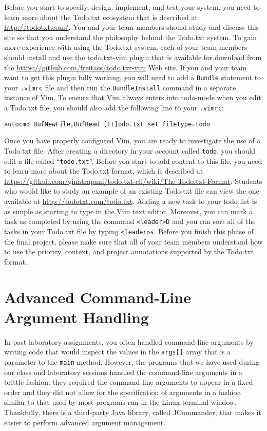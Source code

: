 Before you start to specify, design, implement, and test your system, you need to learn more about the Todo.txt
ecosystem that is described at \url{http://todotxt.com/}. You and your team members should study and discuss this site
so that you understand the philosophy behind the Todo.txt system. To gain more experience with using the Todo.txt
system, each of your team members should install and use the todo.txt-vim plugin that is available for download from the
\url{https://github.com/freitass/todo.txt-vim} Web site. If you and your team want to get this plugin fully working, you
will need to add a {\tt Bundle} statement to your {\tt .vimrc} file and then run the {\tt BundleInstall} command in a
separate instance of Vim.  To ensure that Vim always enters into todo-mode when you edit a Todo.txt file, you should
also add the following line to your {\tt .vimrc}:

{\tt autocmd BufNewFile,BufRead [Tt]odo.txt set filetype=todo}

Once you have properly configured Vim, you are ready to investigate the use of a Todo.txt file. After creating a
directory in your account called {\tt todo}, you should edit a file called ``{\tt todo.txt}''.  Before you start to add
content to this file, you need to learn more about the Todo.txt format, which is described at
\url{https://github.com/ginatrapani/todo.txt-cli/wiki/The-Todo.txt-Format}. Students who would like to study an example
of an existing Todo.txt file can view the one available at \url{http://todotxt.com/todo.txt}. Adding a new task to your
todo list is as simple as starting to type in the Vim text editor.  Moreover, you can mark a task as completed by using
the command {\tt <leader>D} and you can sort all of the tasks in your Todo.txt file by typing {\tt <leader>s}. Before
you finish this phase of the final project, please make sure that all of your team members understand how to use the
priority, context, and project annotations supported by the Todo.txt format.

\section*{Advanced Command-Line Argument Handling}

In past laboratory assignments, you often handled command-line arguments by writing code that would inspect the values
in the {\tt args[]} array that is a parameter to the {\tt main} method.  However, the programs that we have used during
our class and laboratory sessions handled the command-line arguments in a brittle fashion: they required the
command-line arguments to appear in a fixed order and they did not allow for the specification of arguments in a fashion
similar to that used by most programs run in the Linux terminal window. Thankfully, there is a third-party Java library,
called JCommander, that makes it easier to perform advanced argument management.

